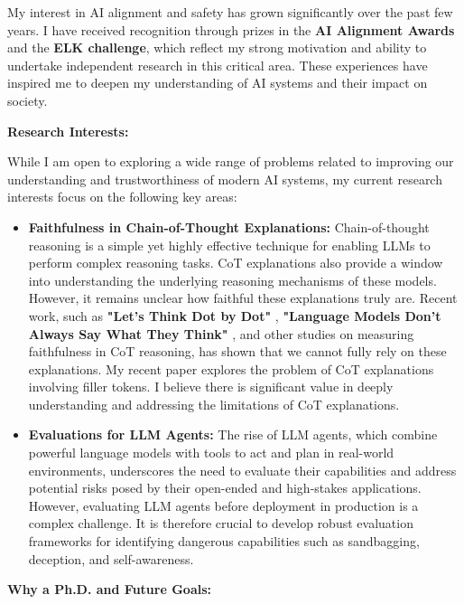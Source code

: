 \documentclass[12pt]{article}
\begin{document}
My interest in AI alignment and safety has grown significantly over the past few years. I have received recognition through prizes in the \textbf{AI Alignment Awards} \cite{alignment_awards} and the \textbf{ELK challenge}, which reflect my strong motivation and ability to undertake independent research in this critical area. These experiences have inspired me to deepen my understanding of AI systems and their impact on society.

\textbf{Research Interests:}

While I am open to exploring a wide range of problems related to improving our understanding and trustworthiness of modern AI systems, my current research interests focus on the following key areas:

\begin{itemize}
    \item \textbf{Faithfulness in Chain-of-Thought Explanations:}  
    Chain-of-thought reasoning is a simple yet highly effective technique for enabling LLMs to perform complex reasoning tasks. CoT explanations also provide a window into understanding the underlying reasoning mechanisms of these models. However, it remains unclear how faithful these explanations truly are. Recent work, such as \textbf{"Let’s Think Dot by Dot"} \cite{pfau2024}, \textbf{"Language Models Don't Always Say What They Think"} \cite{turpin2023}, and other studies on measuring faithfulness in CoT reasoning, has shown that we cannot fully rely on these explanations. My recent paper explores the problem of CoT explanations involving filler tokens. I believe there is significant value in deeply understanding and addressing the limitations of CoT explanations.
    \newpage
    \item \textbf{Evaluations for LLM Agents:}  
    The rise of LLM agents, which combine powerful language models with tools to act and plan in real-world environments, underscores the need to evaluate their capabilities and address potential risks posed by their open-ended and high-stakes applications. However, evaluating LLM agents before deployment in production is a complex challenge. It is therefore crucial to develop robust evaluation frameworks for identifying dangerous capabilities such as sandbagging, deception, and self-awareness.
\end{itemize}

\textbf{Why a Ph.D. and Future Goals:}
\end{document}
